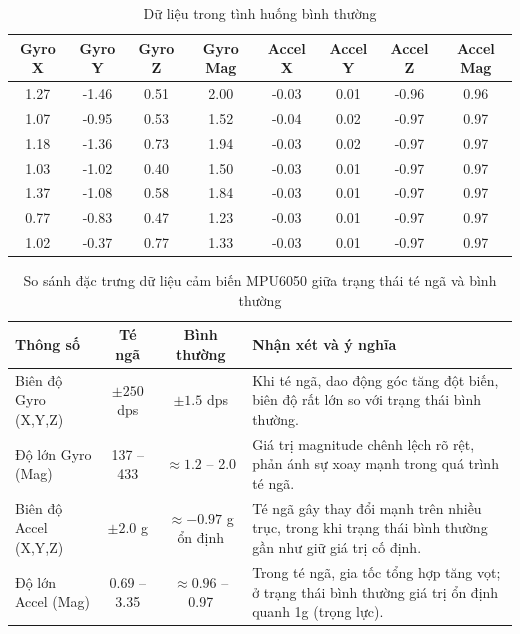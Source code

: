 \begin{table}[H]
\centering
\caption{Dữ liệu trong tình huống bình thường}
\label{tab:normal_data}
\begin{tabular}{|c|c|c|c|c|c|c|c|}
\hline
\textbf{Gyro X} & \textbf{Gyro Y} & \textbf{Gyro Z} & \textbf{Gyro Mag} & \textbf{Accel X} & \textbf{Accel Y} & \textbf{Accel Z} & \textbf{Accel Mag} \\
\hline
1.27 & -1.46 & 0.51 & 2.00 & -0.03 & 0.01 & -0.96 & 0.96 \\
1.07 & -0.95 & 0.53 & 1.52 & -0.04 & 0.02 & -0.97 & 0.97 \\
1.18 & -1.36 & 0.73 & 1.94 & -0.03 & 0.02 & -0.97 & 0.97 \\
1.03 & -1.02 & 0.40 & 1.50 & -0.03 & 0.01 & -0.97 & 0.97 \\
1.37 & -1.08 & 0.58 & 1.84 & -0.03 & 0.01 & -0.97 & 0.97 \\
0.77 & -0.83 & 0.47 & 1.23 & -0.03 & 0.01 & -0.97 & 0.97 \\
1.02 & -0.37 & 0.77 & 1.33 & -0.03 & 0.01 & -0.97 & 0.97 \\
\hline
\end{tabular}
\end{table}


\begin{table}[H]
\centering
\caption{So sánh đặc trưng dữ liệu cảm biến MPU6050 giữa trạng thái té ngã và bình thường}
\label{tab:mpu6050_comparison}
\begin{tabular}{|l|c|c|p{7cm}|}
\hline
\textbf{Thông số} & \textbf{Té ngã} & \textbf{Bình thường} & \textbf{Nhận xét và ý nghĩa} \\
\hline
Biên độ Gyro (X,Y,Z) & $\pm 250$ dps & $\pm 1.5$ dps & Khi té ngã, dao động góc tăng đột biến, biên độ rất lớn so với trạng thái bình thường. \\
\hline
Độ lớn Gyro (Mag)   & 137 -- 433    & $\approx 1.2$ -- 2.0 & Giá trị magnitude chênh lệch rõ rệt, phản ánh sự xoay mạnh trong quá trình té ngã. \\
\hline
Biên độ Accel (X,Y,Z) & $\pm 2.0$ g  & $\approx -0.97$ g ổn định & Té ngã gây thay đổi mạnh trên nhiều trục, trong khi trạng thái bình thường gần như giữ giá trị cố định. \\
\hline
Độ lớn Accel (Mag)   & 0.69 -- 3.35 & $\approx 0.96$ -- 0.97 & Trong té ngã, gia tốc tổng hợp tăng vọt; ở trạng thái bình thường giá trị ổn định quanh 1g (trọng lực). \\
\hline
\end{tabular}
\end{table}

